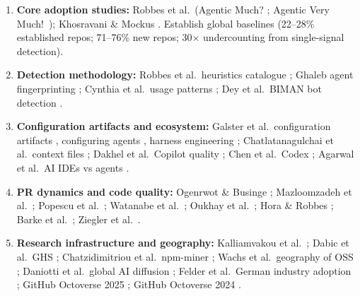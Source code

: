 \documentclass[11pt,a4paper]{article}
\begin{document}
\begin{enumerate}[leftmargin=1.5em, itemsep=4pt]
    \item \textbf{Core adoption studies:} Robbes et al.\ (Agentic Much? \cite{robbes2026agenticmuch};
          Agentic Very Much!\ \cite{robbes2026agenticverymuch}); Khosravani \& Mockus
          \cite{khosravani2026detecting}. Establish global baselines (22--28\% established
          repos; 71--76\% new repos; 30$\times$ undercounting from single-signal detection).

    \item \textbf{Detection methodology:} Robbes et al.\ heuristics catalogue
          \cite{robbes2026promises}; Ghaleb agent fingerprinting \cite{ghaleb2026fingerprinting};
          Cynthia et al.\ usage patterns \cite{cynthia2026};
          Dey et al.\ BIMAN bot detection \cite{dey2020biman}.

    \item \textbf{Configuration artifacts and ecosystem:} Galster et al.\ configuration artifacts
          \cite{galster2026dataset}, configuring agents \cite{galster2026configuring},
          harness engineering \cite{galster2026harness};
          Chatlatanagulchai et al.\ context files \cite{chatlatanagulchai2025agent};
          Dakhel et al.\ Copilot quality \cite{dakhel2023};
          Chen et al.\ Codex \cite{chen2021codex};
          Agarwal et al.\ AI IDEs vs agents \cite{agarwal2026}.

    \item \textbf{PR dynamics and code quality:} Ogenrwot \& Businge \cite{ogenrwot2026how};
          Mazloomzadeh et al.\ \cite{mazloomzadeh2026how};
          Popescu et al.\ \cite{popescu2026investigating};
          Watanabe et al.\ \cite{watanabe2025use};
          Oukhay et al.\ \cite{oukhay2026when};
          Hora \& Robbes \cite{hora2026are};
          Barke et al.\ \cite{barke2023};
          Ziegler et al.\ \cite{ziegler2022}.

    \item \textbf{Research infrastructure and geography:} Kalliamvakou et al.\
          \cite{kalliamvakou2016promises}; Dabic et al.\ GHS \cite{dabic2021sampling};
          Chatzidimitriou et al.\ npm-miner \cite{chatzidimitriou2018};
          Wachs et al.\ geography of OSS \cite{wachs2022geography};
          Daniotti et al.\ global AI diffusion \cite{daniotti2025};
          Felder et al.\ German industry adoption \cite{felder2026};
          GitHub Octoverse 2025 \cite{github2025octoverse};
          GitHub Octoverse 2024 \cite{github2024octoverse}.
\end{enumerate}
\end{document}
